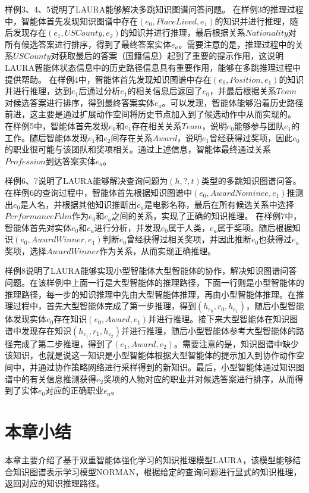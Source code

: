 \documentclass[algorithmlist, AutoFakeBold, AutoFakeSlant, figurelist, tablelist, nomlist, engineering, openany]{seuthesix} %
\begin{document}
样例3、4、5说明了LAURA能够解决多跳知识图谱问答问题。
在样例3的推理过程中，智能体首先发现知识图谱中存在$(e_0, PlaceLived, e_1)$的知识并进行推理，随后发现存在$(e_1, USCounty, e_2)$的知识并进行推理，最后根据关系$Nationality$对所有候选答案进行排序，得到了最终答案实体$e_a$。需要注意的是，推理过程中的关系$USCounty$对获取最后的答案（国籍信息）起到了重要的提示作用，这说明LAURA智能体状态信息中的历史路径信息具有重要作用，能够在多跳推理过程中提供帮助。
在样例4中，智能体首先发现知识图谱中存在$(e_0, Position, e_1)$的知识并进行推理，达到$e_1$后通过分析$e_1$的相关信息后返回了$e_0$，并最后根据关系$Team$对候选答案进行排序，得到最终答案实体$e_a$。可以发现，智能体能够沿着历史路径前进，这主要是通过扩展动作空间将历史节点加入到了候选动作中从而实现的。
在样例5中，智能体首先发现$e_0$和$e_1$存在相关关系$Team$，说明$e_0$能够参与团队$e_1$的工作。随后智能体发现$e_1$和$e_2$间存在关系$Award$，说明$e_1$曾经获得过奖项，因此$e_0$的职业很可能与该团队和奖项相关。通过上述信息，智能体最终通过关系$Profession$到达答案实体$e_a$。

样例6、7说明了LAURA能够解决查询问题为$(h, ?, t)$类型的多跳知识图谱问答。
在样例6的查询过程中，智能体首先根据知识图谱中$(e_0, AwardNominee, e_1)$推测出$e_0$是人名，并根据其他知识推断出$e_a$是电影名称，最后在所有候选关系中选择$PerformanceFilm$作为$e_0$和$e_a$之间的关系，实现了正确的知识推理。
在样例7中，智能体首先对实体$e_0$和$e_a$进行分析，并发现$e_0$属于人类，$e_a$属于奖项。随后根据知识$(e_0, AwardWinner, e_1)$判断$e_0$曾经获得过相关奖项，并因此推断$e_0$也获得过$e_a$奖项，选择$AwardWinner$作为关系，从而实现正确推理。

样例8说明了LAURA能够实现小型智能体大型智能体的协作，解决知识图谱问答问题。在该样例中上面一行是大型智能体的推理路径，下面一行则是小型智能体的推理路径，每一步的知识推理中先由大型智能体推理，再由小型智能体推理。在推理过程中，首先大型智能体完成了第一步推理，得到$(h_{e_0}, r_0, h_{e_1})$，随后小型智能体发现实体$e_0$存在知识$(e_0, Award, e_1)$并进行推理。接下来大型智能体在知识图谱中发现存在知识$(h_{e_1}, r_1, h_{e_2})$并进行推理，随后小型智能体参考大型智能体的路径完成了第二步推理，得到了$(e_1, Award, e_2)$。需要注意的是，知识图谱中缺少该知识，也就是说这一知识是小型智能体根据大型智能体的提示加入到协作动作空间中，并通过协作策略网络进行采样得到的新知识。最后，小型智能体通过知识图谱中的有关信息推测获得$e_2$奖项的人物对应的职业并对候选答案进行排序，从而得到了实体$e_0$对应的正确职业$e_a$。

\section{本章小结}
本章主要介绍了基于双重智能体强化学习的知识推理模型LAURA，该模型能够结合知识图谱表示学习模型NORMAN，根据给定的查询问题进行显式的知识推理，返回对应的知识推理路径。
\end{document}

